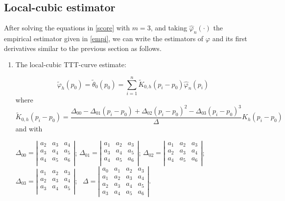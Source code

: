 \documentclass[preprint,12pt]{elsarticle}
\begin{document}
\subsection{Local-cubic estimator}
\noindent After solving the equations in \eqref{score} with $m=3$, and taking  $\widehat{\varphi}_n\left(\cdot\right)$ the empirical estimator given in \eqref{empi}, we can write the estimators of $\varphi$ and its first derivatives similar to the previous section as follows.

%
\begin{enumerate}
\item The local-cubic TTT-curve estimate: %

\begin{equation}\label{phi.cub}
\widetilde{\varphi}_h(p_0)= \widetilde{\theta}_0(p_0)=\sum_{i=1}^n \widetilde{K}_{0,h}\left(p_i-p_0\right) \widehat{\varphi}_n\left(p_i\right)
\end{equation}
where
\[\widetilde{K}_{0,h}\left(p_i-p_0\right)=\frac{\Delta_{00}-\Delta_{01}\left(p_i-p_0 \right)+\Delta_{02}\left(p_i-p_0 \right)^2-\Delta_{03}\left(p_i-p_0 \right)^3}{\Delta} K_h\left(p_i-p_0\right)\]
and with 

\begin{center}
$
\Delta_{00}=\left|\begin{array}{ccc}
a_2 & a_3 &a_4 \\ 
a_{3} & a_4 &a_{5}\\
 a_4 &a_5 &a_6 \\ 
\end{array}\right| $;   $\Delta_{01}=\left|\begin{array}{ccc}
a_1 & a_2 &a_3 \\ 
a_{3} & a_4 &a_{5}\\
 a_4 &a_5 &a_6 \\ 
\end{array}\right|$; $\Delta_{02}=\left|\begin{array}{ccc}
a_1 & a_2 &a_3 \\ 
a_{2} & a_3 &a_{4}\\
 a_4 &a_5 &a_6 \\ 
\end{array}\right|$;  $\Delta_{03}=\left|\begin{array}{ccc}
a_1 & a_2 &a_3 \\ 
a_{2} & a_3 &a_{4}\\
 a_3 &a_4 &a_5 \\ 
\end{array}\right|$; \ 
$
\Delta=\left|\begin{array}{cccc}
a_0 & a_1&a_2 &a_3 \\ 
a_{1} & a_2&a_3 &a_{4}\\
a_2 & a_3 &a_4 &a_5 \\ 
a_3 & a_4&a_5 &a_{6} 
\end{array}\right|.
$
\end{center}


\end{enumerate}
\end{document}
